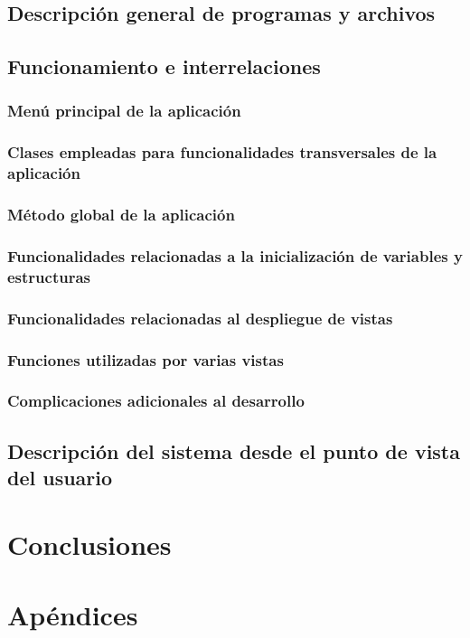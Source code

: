 \documentclass[11pt,titlepage]{article} %
\begin{document}
	\subsection{Descripción general de programas y archivos}
	\subsection{Funcionamiento e interrelaciones}
		\subsubsection{Menú principal de la aplicación}
		\subsubsection{Clases empleadas para funcionalidades transversales de la aplicación}
		\subsubsection{Método global de la aplicación}
		\subsubsection{Funcionalidades relacionadas a la inicialización de variables y estructuras}
		\subsubsection{Funcionalidades relacionadas al despliegue de vistas}
		\subsubsection{Funciones utilizadas por varias vistas}
		\subsubsection{Complicaciones adicionales al desarrollo}
	\subsection{Descripción del sistema desde el punto de vista del usuario}
\section{Conclusiones}
\section{Apéndices}

\end{document}
